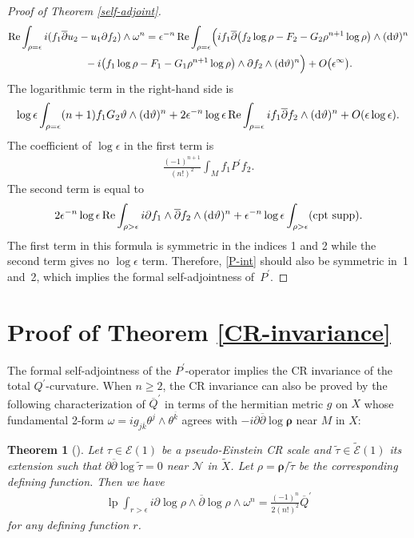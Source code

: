 \documentclass[pdftex]{sigma}
\numberwithin{equation}{section}
\newtheorem{Theorem}{Theorem}[section]
\begin{document}
\begin{proof}[Proof of Theorem \ref{self-adjoint}]
\begin{gather*}
\operatorname{Re}\int_{\rho=\epsilon} i(f_1\overline{\partial}u_2-u_1\partial f_2)\wedge\omega^n
 =\epsilon^{-n}\operatorname{Re}\int_{\rho=\epsilon} \Bigl(if_1\overline{\partial}\big(f_2\log\rho-F_2-G_2\rho^{n+1}\log\rho\big)
\wedge({\rm d}\vartheta)^n \\
 \qquad {} -i\big(f_1\log\rho-F_1-G_1\rho^{n+1}\log\rho\big)\wedge\partial f_2\wedge ({\rm d}\vartheta)^n\Bigr)+O\big(\epsilon^\infty\big).
\end{gather*}
The logarithmic term in the right-hand side is
\begin{gather*}
\log\epsilon\int_{\rho=\epsilon}(n+1)f_1G_2\vartheta\wedge({\rm d}\vartheta)^n+2\epsilon^{-n}\log\epsilon
 \operatorname{Re}\int_{\rho=\epsilon}if_1\overline{\partial}f_2\wedge({\rm d}\vartheta)^n+O(\epsilon\log\epsilon).
\end{gather*}
The coef\/f\/icient of $\log\epsilon$ in the f\/irst term is
\begin{gather}\label{P-int}
\frac{(-1)^{n+1}}{(n!)^2}\int_M f_1P^\prime f_2.
\end{gather}
The second term is equal to
\begin{gather*}
2\epsilon^{-n}\log\epsilon \operatorname{Re}\int_{\rho>\epsilon} i\partial f_1\wedge\overline{\partial}f_2\wedge({\rm d}\vartheta)^n
+\epsilon^{-n}\log\epsilon\int_{\rho>\epsilon} ({\rm cpt\ supp}).
\end{gather*}
The f\/irst term in this formula is symmetric in the indices 1 and 2 while the second term gives no $\log\epsilon$ term. Therefore, \eqref{P-int} should also be symmetric in~1 and~2, which implies the formal self-adjointness of~$P^\prime$.
\end{proof}

\section{Proof of Theorem \ref{CR-invariance}}
The formal self-adjointness of the $P^\prime$-operator implies the CR invariance of the total $Q^\prime$-curva\-tu\-re. When $n\ge 2$, the CR invariance can also be proved by the following characterization of $\overline{Q}^\prime$ in terms of the hermitian metric $g$ on $X$ whose fundamental 2-form $\omega=ig_{j\overline k}\theta^j\wedge\theta^{\overline k}$ agrees with $-i\partial\overline{\partial}\log\boldsymbol\rho$ near $M$ in $X$:

\begin{Theorem}[{\cite[Theorem 5.6]{Hirachi}}]\label{total-Q-prime}
Let $\tau\in\mathcal{E}(1)$ be a pseudo-Einstein CR scale and $\widetilde\tau\in\widetilde{\mathcal{E}}(1)$ its extension such that $\partial\overline{\partial}\log\widetilde\tau=0$ near $\mathcal{N}$ in $\widetilde X$. Let $\rho=\boldsymbol\rho/\widetilde\tau$ be the corresponding defining function. Then we have
\begin{gather}\label{Q-prime-lp}
\operatorname{lp}\int_{r>\epsilon} i\partial\log \rho\wedge \overline{\partial}\log\rho\wedge \omega^n
=\frac{(-1)^n}{2(n!)^2}\overline{Q}^\prime
\end{gather}
for any defining function $r$.
\end{Theorem}
\end{document}
